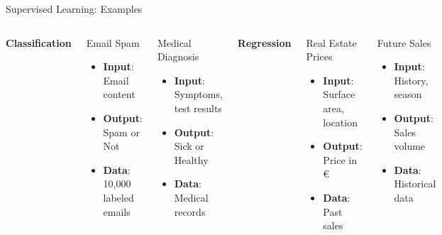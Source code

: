 \documentclass[12pt,aspectratio=169]{beamer}
\begin{document}
\begin{frame}{Supervised Learning: Examples}
\begin{columns}[T]
\textbf{Classification}
\begin{exampleblock}{Email Spam}
\begin{itemize}
\item \textbf{Input}: Email content
\item \textbf{Output}: Spam or Not
\item \textbf{Data}: 10,000 labeled emails
\end{itemize}
\end{exampleblock}

\begin{exampleblock}{Medical Diagnosis}
\begin{itemize}
\item \textbf{Input}: Symptoms, test results
\item \textbf{Output}: Sick or Healthy
\item \textbf{Data}: Medical records
\end{itemize}
\end{exampleblock}

\textbf{Regression}
\begin{exampleblock}{Real Estate Prices}
\begin{itemize}
\item \textbf{Input}: Surface area, location
\item \textbf{Output}: Price in €
\item \textbf{Data}: Past sales
\end{itemize}
\end{exampleblock}

\begin{exampleblock}{Future Sales}
\begin{itemize}
\item \textbf{Input}: History, season
\item \textbf{Output}: Sales volume
\item \textbf{Data}: Historical data
\end{itemize}
\end{exampleblock}
\end{columns}
\end{frame}
\end{document}
